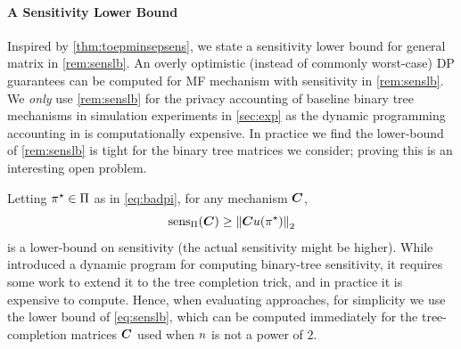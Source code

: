 \paragraph{A Sensitivity Lower Bound} Inspired by \cref{thm:toepminsepsens}, we state a sensitivity lower bound for general matrix in \cref{rem:senslb}. 
An overly optimistic (instead of commonly worst-case) DP guarantees can be computed for MF mechanism with sensitivity in \cref{rem:senslb}. We \emph{only} use \cref{rem:senslb} for the privacy accounting of baseline binary tree mechanisms in simulation experiments in \cref{sec:exp} as the dynamic programming accounting in \citep{kairouz21practical} is computationally expensive. 
In practice we find the lower-bound of \cref{rem:senslb} is tight for the binary tree matrices we consider; proving this is an interesting open problem.
\begin{rem}\label{rem:senslb}
Letting $\pi^\star \in \Pi$ as in \cref{eq:badpi}, for any mechanism ${\bm{C}}$,
\begin{equation}\label{eq:senslb}
\operatorname{sens}_\Pi({\bm{C}}) \geq \left\|{{\bm{C}} u(\pi^\star)}\right\|_2 
\end{equation}
is a lower-bound on sensitivity (the actual sensitivity might be higher). While \citet{kairouz21practical} introduced a dynamic program for computing binary-tree sensitivity, it requires some work to extend it to the tree completion trick, and in practice it is expensive to compute. Hence, when evaluating \treeagg approaches, for simplicity we use the lower bound of \cref{eq:senslb}, which can be computed immediately for the tree-completion matrices ${\bm{C}}$ used when $n$ is not a power of $2$.
\end{rem}


